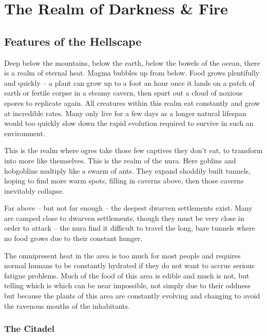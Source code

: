 \section{The Realm of Darkness \& Fire}\label{darknessandfire}

\begin{multicols}{2}

\subsection{Features of the Hellscape}

Deep below the mountains, below the earth, below the bowels of the ocean, there is a realm of eternal heat.
Magma bubbles up from below.
Food grows plentifully and quickly -- a plant can grow up to a foot an hour once it lands on a patch of earth or fertile corpse in a steamy cavern, then spurt out a cloud of noxious spores to replicate again.
All creatures within this realm eat constantly and grow at incredible rates.
Many only live for a few days as a longer natural lifespan would too quickly slow down the rapid evolution required to survive in such an environment.

This is the realm where ogres take those few captives they don't eat, to transform into more like themselves.
This is the realm of the nura.
Here goblins and hobgoblins multiply like a swarm of ants.
They expand shoddily built tunnels, hoping to find more warm spots, filling in caverns above, then those caverns inevitably collapse.

Far above -- but not far enough -- the deepest dwarven settlements exist.
Many are camped close to dwarven settlements, though they must be very close in order to attack -- the nura find it difficult to travel the long, bare tunnels where no food grows due to their constant hunger.

The omnipresent heat in the area is too much for most people and requires normal humans to be constantly hydrated if they do not want to accrue serious fatigue problems.
  Much of the food of this area is edible and much is not, but telling which is which can be near impossible, not simply due to their oddness but because the plants of this area are constantly evolving and changing to avoid the ravenous mouths of the inhabitants.


\subsubsection{The Citadel}


\end{multicols}
